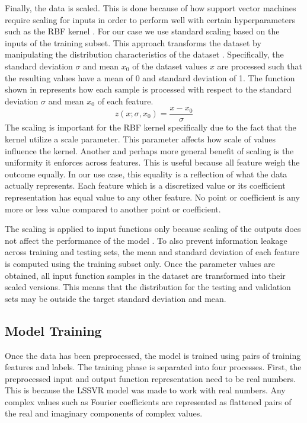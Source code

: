 Finally, the data is scaled. This is done because of how support vector machines require scaling for inputs in order to perform well with certain hyperparameters such as the RBF kernel \autocite{ben-hurUsersGuideSupport2010}. For our case we use standard scaling based on the inputs of the training subset. This approach transforms the dataset by manipulating the distribution characteristics of the dataset \autocite{ahsanEffectDataScaling2021}. Specifically, the standard deviation \(\sigma \) and mean \(x_0\) of the dataset values \(x\) are processed such that the resulting values have a mean of 0 and standard deviation of 1. The function shown in  represents how each sample is processed with respect to the standard deviation \(\sigma \) and mean \(x_0\) of each feature.
\begin{equation}
  z(x;\sigma,x_0)=\frac{x-x_0}{\sigma} \label{eq:standard_scaler}
\end{equation}
The scaling is important for the RBF kernel specifically due to the fact that the kernel utilize a scale parameter. This parameter affects how scale of values influence the kernel. Another and perhaps more general benefit of scaling is the uniformity it enforces across features. This is useful because all feature weigh the outcome equally. In our use case, this equality is a reflection of what the data actually represents. Each feature which is a discretized value or its coefficient representation has equal value to any other feature. No point or coefficient is any more or less value compared to another point or coefficient.

The scaling is applied to input functions only because scaling of the outputs does not affect the performance of the model \autocite{ben-hurUsersGuideSupport2010}. To also prevent information leakage across training and testing sets, the mean and standard deviation of each feature is computed using the training subset only. Once the parameter values are obtained, all input function samples in the dataset are transformed into their scaled versions. This means that the distribution for the testing and validation sets may be outside the target standard deviation and mean. %

\subsection{Model Training}
\noindent Once the data has been preprocessed, the model is trained using pairs of training features and labels. The training phase is separated into four processes. First, the preprocessed input and output function representation need to be real numbers. This is because the LSSVR model was made to work with real numbers. Any complex values such as Fourier coefficients are represented as flattened pairs of the real and imaginary components of complex values. %

